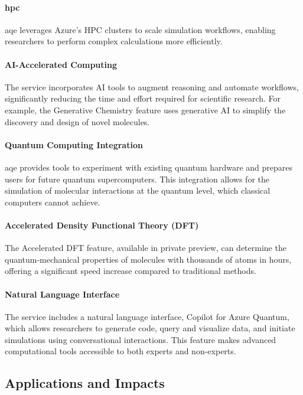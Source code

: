 \documentclass{tufte-handout}
\begin{document}
\paragraph{\gls{hpc}}\label{sec:hpc} \gls{aqe} leverages Azure's HPC clusters to scale simulation workflows, enabling researchers to perform complex calculations more efficiently.
\paragraph{AI-Accelerated Computing}\label{sec:ai-Accelerated} The service incorporates AI tools to augment reasoning and automate workflows, significantly reducing the time and effort required for scientific research. For example, the Generative Chemistry feature uses generative AI to simplify the discovery and design of novel molecules.
\paragraph{Quantum Computing Integration}\label{sec:quantum-computing-integration} \gls{aqe} provides tools to experiment with existing quantum hardware and prepares users for future quantum supercomputers. This integration allows for the simulation of molecular interactions at the quantum level, which classical computers cannot achieve.
\paragraph{Accelerated Density Functional Theory (DFT)}\label{sec:dft} The Accelerated DFT feature, available in private preview, can determine the quantum-mechanical properties of molecules with thousands of atoms in hours, offering a significant speed increase compared to traditional methods.
\paragraph{Natural Language Interface}\label{sec:natural-language-interface} The service includes a natural language interface, Copilot for Azure Quantum, which allows researchers to generate code, query and visualize data, and initiate simulations using conversational interactions. This feature makes advanced computational tools accessible to both experts and non-experts.

\subsection{Applications and Impacts}\label{sec:applicationss-and-impact}
\end{document}
